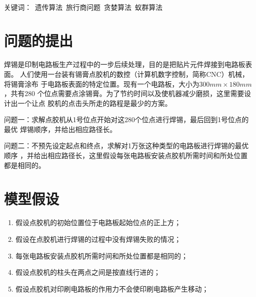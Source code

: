 \documentclass[fontset=windows,a4paper,12pt]{ctexart}
\begin{document}
  \\
  关键词：\ 遗传算法\ 旅行商问题\ 贪婪算法\ 蚁群算法

  \newpage
  \section{问题的提出}
    焊锡是印制电路板生产过程中的一步后续处理，目的是把贴片元件焊接到电路板表面。
    人们使用一台装有锡膏点胶机的数控（计算机数字控制，简称CNC）机械，将锡膏涂布
    于电路板表面的特定位置。现有一个电路板，大小为$300mm\times180mm$，共有280
    个位点需要点涂锡膏。为了节约时间以及使机器减少磨损，这里需要设计出一个让点
    胶机的点击头所走的路程是最少的方案。

    问题一：求解点胶机从1号位点开始对这280个位点进行焊锡，最后回到1号位点的最优
    焊锡顺序，并给出相应路径长。

    问题二：不预先设定起点和终点，求解对1万张这种类型的电路板进行焊锡的最优顺序
    ，并给出相应路径长，这里假设每张电路板安装点胶机所需时间和所处位置都是相同的。
  \newpage
  
  \section{模型假设}
    \begin{enumerate}
      \item 假设点胶机的初始位置位于电路板起始位点的正上方；
      \item 假设在点胶机进行焊锡的过程中没有焊锡失败的情况；
      \item 每张电路板安装点胶机所需时间和所处位置都是相同的；
      \item 假设点胶机的柱头在两点之间是按直线行进的；
      \item 假设点胶机对印刷电路板的作用力不会使印刷电路板产生移动；
    \end{enumerate}
    
\end{document}
